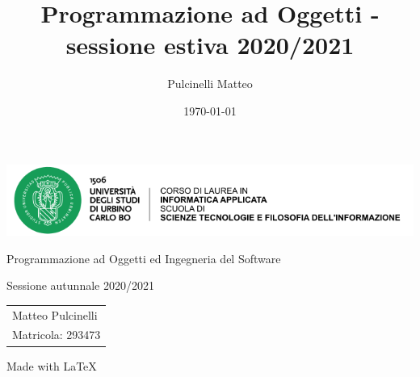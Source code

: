 \documentclass[12pt, a4paper]{article}
\title{Programmazione ad Oggetti - sessione estiva 2020/2021}
\date{\today}
\author{Pulcinelli Matteo}
\begin{document}
\begin{titlepage}
    \centering
    \includegraphics[width=\textwidth]{../logo.png}
    \par\vspace{1cm}
    \vspace{2cm}

    {\huge Programmazione ad Oggetti ed Ingegneria del Software\par}
    \vspace{0.5cm}

    {\Large Sessione autunnale 2020/2021\par}
    \vspace{5cm}

    \begin{tabular}{l}
        \large Matteo Pulcinelli \par \\
        \large Matricola: 293473 \par \\
    \end{tabular}


    \vfill
    \vspace{0.3cm}
    Made with \LaTeX
\end{titlepage}

\newpage\null\thispagestyle{empty}\newpage
{}
\tableofcontents
\newpage


\newpage



\newpage



\newpage



\newpage


\newpage

\newpage

\newpage


\end{document}
